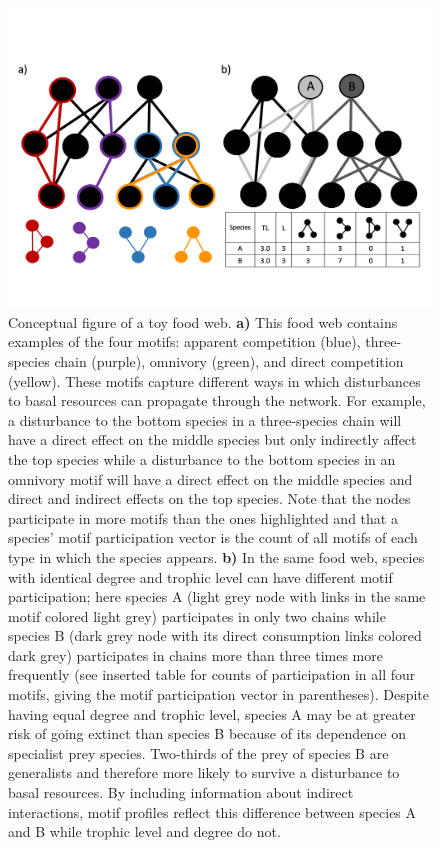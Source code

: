 \documentclass[12pt]{article}
\begin{document}
\begin{spacing}{2.0}
        \begin{figure}[hb!]
        \centering
        \includegraphics[width=.9\textwidth]{figures/Figure_1.png}
        \caption{Conceptual figure of a toy food web. \textbf{a)} This food web contains examples of the four motifs: apparent competition (blue), three-species chain (purple), omnivory (green), and direct competition (yellow). These motifs capture different ways in which disturbances to basal resources can propagate through the network. For example, a disturbance to the bottom species in a three-species chain will have a direct effect on the middle species but only indirectly affect the top species while a disturbance to the bottom species in an omnivory motif will have a direct effect on the middle species and direct and indirect effects on the top species. 
        Note that the nodes participate in more motifs than the ones highlighted and that a species' motif participation vector is the count of all motifs of each type in which the species appears. \textbf{b)} In the same food web, species with identical degree and trophic level can have different motif participation; here species A (light grey node with links in the same motif colored light grey) participates in only two chains while species B (dark grey node with its direct consumption links colored dark grey) participates in chains more than three times more frequently (see inserted table for counts of participation in all four motifs, giving the motif participation vector in parentheses). 
        Despite having equal degree and trophic level, species A may be at greater risk of going extinct than species B because of its dependence on specialist prey species. Two-thirds of the prey of species B are generalists and therefore more likely to survive a disturbance to basal resources. By including information about indirect interactions, motif profiles reflect this difference between species A and B while trophic level and degree do not.}
    \label{fig:concept}
    \end{figure}



\end{spacing}
\end{document}
